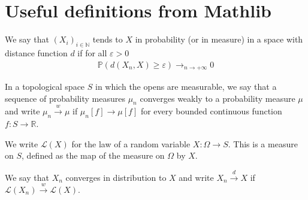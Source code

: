 \chapter{Useful definitions from Mathlib}

\begin{definition}\label{def:cvg_probability}
 \leanok
We say that $(X_i)_{i \in \mathbb{N}}$ tends to $X$ in probability (or in measure) in a space with distance function $d$ if for all $\varepsilon > 0$
\begin{align*}
\mathbb{P}(d(X_n, X) \ge \varepsilon) \to_{n \to +\infty} 0
\end{align*}
\end{definition}

\begin{definition}\label{def:weak_cvg_measure}
 \leanok
In a topological space $S$ in which the opens are measurable, we say that a sequence of probability measures $\mu_n$ converges weakly to a probability measure $\mu$ and write $\mu_n \xrightarrow{w} \mu$ if $\mu_n[f] \to \mu[f]$ for every bounded continuous function $f : S \to \mathbb{R}$.
\end{definition}

We write $\mathcal L(X)$ for the law of a random variable $X : \Omega \to S$. This is a measure on $S$, defined as the map of the measure on $\Omega$ by $X$.

\begin{definition}\label{def:cvg_distribution}
We say that $X_n$ converges in distribution to $X$ and write $X_n \xrightarrow{d} X$ if $\mathcal L(X_n) \xrightarrow{w} \mathcal L(X)$.
\end{definition}
